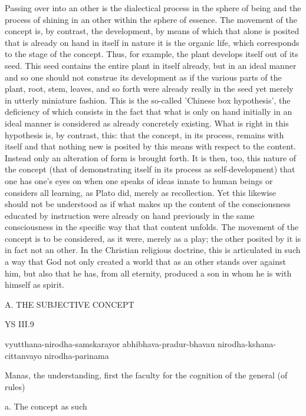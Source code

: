 Passing over into an other is the dialectical process in the sphere of being and
the process of shining in an other within the sphere of essence.
The movement of the concept is, by contrast, the development, by means of which
that alone is posited that is already on hand in itself in nature it is the organic life,
which corresponds to the stage of the concept.
Thus, for example, the plant develops itself out of its seed.
This seed contains the entire plant in itself already,
but in an ideal manner and so one should not construe its development as if the various
parts of the plant, root, stem, leaves, and so forth were already really in the seed yet
merely in utterly miniature fashion.
This is the so-called 'Chinese box hypothesis',
the deficiency of which consists in the fact that what is only on hand initially
in an ideal manner is considered as already concretely existing.
What is right in this hypothesis is, by contrast, this:
that the concept, in its process, remains with itself and
that nothing new is posited by this means with respect to the content.
Instead only an alteration of form is brought forth.
It is then, too, this nature of the concept
(that of demonstrating itself in its process as self-development)
that one has one's eyes on when one speaks of ideas innate to human beings or
considers all learning, as Plato did, merely as recollection.
Yet this likewise should not be understood as if what makes up the content of
the consciousness educated by instruction were already on hand previously in
the same consciousness in the specific way that that content unfolds.
The movement of the concept is to be considered, as it were, merely as a play;
the other posited by it is in fact not an other.
In the Christian religious doctrine, this is articulated in such a way that God
not only created a world that as an other stands over against him,
but also that he has, from all eternity, produced a son in whom he is with himself as spirit.

A. THE SUBJECTIVE CONCEPT

YS III.9

vyutthana-nirodha-samskarayor abhibhava-pradur-bhavau nirodha-kshana-cittanvayo nirodha-parinama

Manas, the understanding, first the faculty for the cognition of the general (of rules)

a. The concept as such

